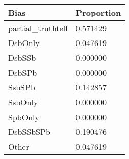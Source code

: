 \begin{tabular}{p{3cm}p{7cm}}
\toprule
Bias & Proportion \\
\midrule
partial_truthtell & 0.571429 \\
DsbOnly & 0.047619 \\
DsbSSb & 0.000000 \\
DsbSPb & 0.000000 \\
SsbSPb & 0.142857 \\
SsbOnly & 0.000000 \\
SpbOnly & 0.000000 \\
DsbSSbSPb & 0.190476 \\
Other & 0.047619 \\
\bottomrule
\end{tabular}
